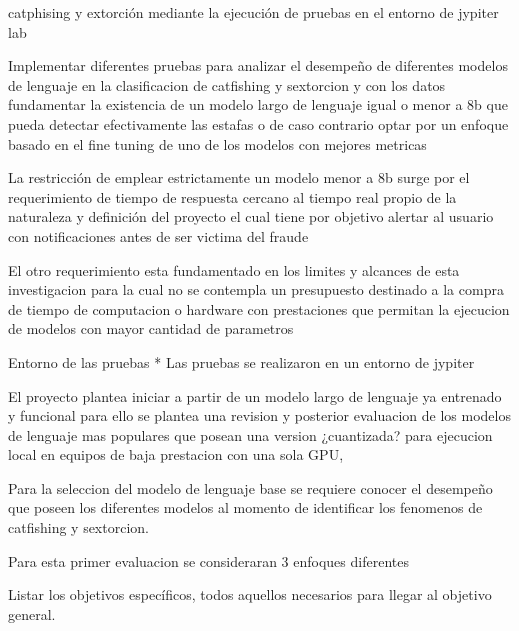 catphising y extorción mediante la ejecución de pruebas en el entorno de jypiter lab

Implementar diferentes pruebas para analizar el desempeño de diferentes modelos de lenguaje en la clasificacion de catfishing y sextorcion y con los datos fundamentar la existencia de un modelo largo de lenguaje igual o menor a 8b que pueda detectar efectivamente las estafas o de caso contrario optar por un enfoque basado en el fine tuning de uno de los modelos con mejores metricas  

La restricción de emplear estrictamente un modelo menor a 8b surge por el requerimiento de tiempo de respuesta cercano al tiempo real propio de la naturaleza y definición del proyecto el cual tiene por objetivo alertar al usuario con notificaciones antes de ser victima del fraude

El otro requerimiento esta fundamentado en los limites y alcances de esta investigacion para la cual no se contempla un presupuesto destinado a la compra de tiempo de computacion o hardware con prestaciones que permitan la ejecucion de modelos con mayor cantidad de parametros

Entorno de las pruebas
* Las pruebas se realizaron en un entorno de jypiter 

El proyecto plantea iniciar a partir de un modelo largo de lenguaje ya entrenado y funcional para ello se plantea una revision y posterior evaluacion de los modelos de lenguaje mas populares que posean una version ¿cuantizada? para ejecucion local en equipos de baja prestacion con una sola GPU,

Para la seleccion del modelo de lenguaje base se requiere conocer el desempeño que poseen los diferentes modelos al momento de identificar los fenomenos de catfishing y sextorcion.

Para esta primer evaluacion se consideraran 3 enfoques diferentes



Listar los objetivos específicos, todos aquellos necesarios para llegar al objetivo general.




